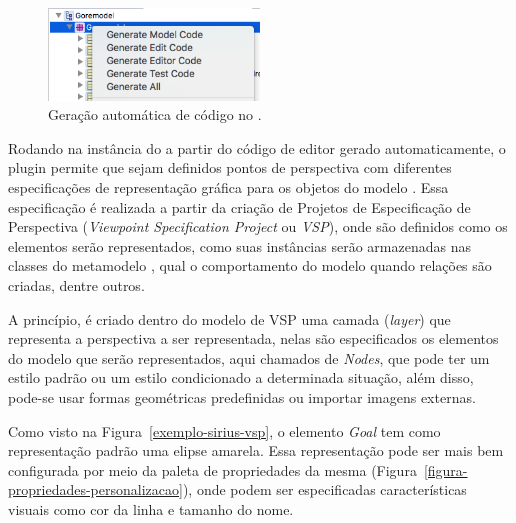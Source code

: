 
\begin{figure}
	\centering
	\includegraphics[width=0.5\textwidth]{figuras/unagi/exemplo-gera-codigo.png}
	\caption{Geração automática de código no \eclipse.}
	\label{figura-gera-codigo}
\end{figure}

Rodando na instância do \eclipse a partir do código de editor gerado automaticamente, o plugin \sirius permite que sejam definidos pontos de perspectiva com diferentes especificações de representação gráfica para os objetos do modelo \ecore. Essa especificação é realizada a partir da criação de Projetos de Especificação de Perspectiva (\textit{Viewpoint Specification Project} ou \textit{VSP}), onde são definidos como os elementos serão representados, como suas instâncias serão armazenadas nas classes do metamodelo \ecore, qual o comportamento do modelo quando relações são criadas, dentre outros.

A princípio, é criado dentro do modelo de VSP uma camada (\textit{layer}) que representa a perspectiva a ser representada, nelas são especificados os elementos do modelo \ecore que serão representados, aqui chamados de \textit{Nodes}, que pode ter um estilo padrão ou um estilo condicionado a determinada situação, além disso, pode-se usar formas geométricas predefinidas ou importar imagens externas. 

Como visto na Figura~\ref{exemplo-sirius-vsp}, o elemento \textit{Goal} tem como representação padrão uma elipse amarela. Essa representação pode ser mais bem configurada por meio da paleta de propriedades da mesma (Figura~\ref{figura-propriedades-personalizacao}), onde podem ser especificadas características visuais como cor da linha e tamanho do nome.


